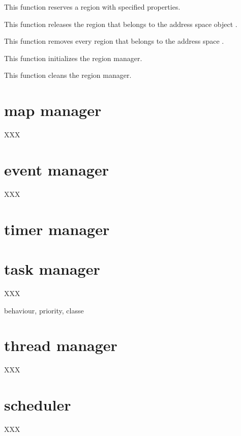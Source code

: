 	 {
	   This function reserves a region with specified properties.
	 }

	 {
	   This function releases the region  that belongs
	   to the address space object .
	 }

	 {
	   This function removes every region that belongs to the
	   address space .
	 }

	 {
	   This function initializes the region manager.
	 }

	 {
	   This function cleans the region manager.
	 }

%
%

\section{map manager}

XXX

%
%

\section{event manager}

XXX

%
%

\section{timer manager}

%
%

\section{task manager}

XXX

behaviour, priority, classe

%
%

\section{thread manager}

XXX

%
%

\section{scheduler}

XXX

